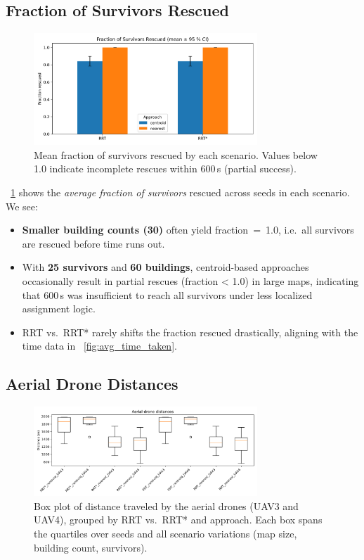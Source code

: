 \documentclass[12pt,a4paper]{report}
\begin{document}
\subsection{Fraction of Survivors Rescued}
\begin{figure}[H]
    \centering
    \includegraphics[width=0.75\textwidth]{figures/fraction_rescued.png}
    \caption{Mean fraction of survivors rescued by each scenario. Values below 1.0 
             indicate incomplete rescues within 600\,s (partial success).}
    \label{fig:fraction_rescued}
\end{figure}

\noindent
\figurename~\ref{fig:fraction_rescued} shows the \emph{average fraction of survivors}
rescued across seeds in each scenario. We see:
\begin{itemize}
    \item \textbf{Smaller building counts (30)} often yield fraction~=~1.0,
          i.e.\ all survivors are rescued before time runs out.
    \item With \textbf{25 survivors} and \textbf{60 buildings}, centroid-based approaches 
          occasionally result in partial rescues (fraction < 1.0) in large maps, 
          indicating that 600\,s was insufficient to reach all survivors under 
          less localized assignment logic.
    \item RRT vs.\ RRT* rarely shifts the fraction rescued drastically, 
          aligning with the time data in \figurename~\ref{fig:avg_time_taken}.
\end{itemize}

\subsection{Aerial Drone Distances}
\begin{figure}[H]
    \centering
    \includegraphics[width=0.75\textwidth]{figures/aerial_distance_box.png}
    \caption{Box plot of distance traveled by the aerial drones (UAV3 and UAV4), 
             grouped by RRT vs.\ RRT* and approach. Each box spans the quartiles 
             over seeds and all scenario variations (map size, building count, survivors).}
    \label{fig:aerial_distance_box}
\end{figure}
\end{document}
